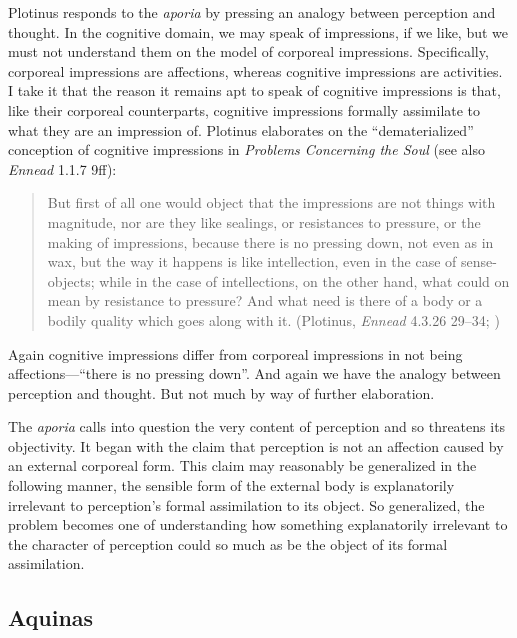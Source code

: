 \documentclass[12pt]{article}
\begin{document}
Plotinus responds to the \emph{aporia} by pressing an analogy between perception and thought. In the cognitive domain, we may speak of impressions, if we like, but we must not understand them on the model of corporeal impressions. Specifically, corporeal impressions are affections, whereas cognitive impressions are activities. I take it that the reason it remains apt to speak of cognitive impressions is that, like their corporeal counterparts, cognitive impressions formally assimilate to what they are an impression of. Plotinus elaborates on the ``dematerialized'' conception of cognitive impressions in \emph{Problems Concerning the Soul} (see also \emph{Ennead} 1.1.7 9ff):
\begin{quote}
	But first of all one would object that the impressions are not things with magnitude, nor are they like sealings, or resistances to pressure, or the making of impressions, because there is no pressing down, not even as in wax, but the way it happens is like intellection, even in the case of sense-objects; while in the case of intellections, on the other hand, what could on mean by resistance to pressure? And what need is there of a body or a bodily quality which goes along with it. (Plotinus, \emph{Ennead} 4.3.26 29--34; \citealt[101]{Dillon:2015yf})
\end{quote}
Again cognitive impressions differ from corporeal impressions in not being affections---``there is no pressing down''. And again we have the analogy between perception and thought. But not much by way of further elaboration.

The \emph{aporia} calls into question the very content of perception and so threatens its objectivity. It began with the claim that perception is not an affection caused by an external corporeal form. This claim may reasonably be generalized in the following manner, the sensible form of the external body is explanatorily irrelevant to perception's formal assimilation to its object. So generalized, the problem becomes one of understanding how something explanatorily irrelevant to the character of perception could so much as be the object of its formal assimilation.


\subsection{Aquinas} %
\label{sub:aquinas}
\end{document}

